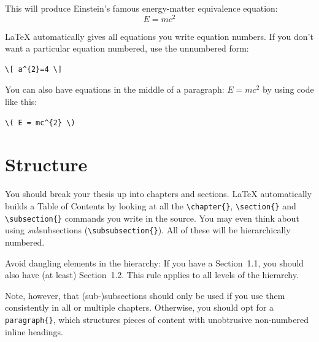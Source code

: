 This will produce Einstein's famous energy-matter equivalence equation:
\begin{equation}
E = mc^{2}
\label{eqn:Einstein}
\end{equation}

LaTeX automatically gives all equations you write equation numbers. If you don't want a particular equation numbered, use the unnumbered form:

\begin{lstlisting}[language={[LaTeX]TeX}]
\[ a^{2}=4 \]
\end{lstlisting}

You can also have equations in the middle of a paragraph: \( E = mc^{2} \) by using code like this: 

\begin{lstlisting}[language={[LaTeX]TeX}]
\( E = mc^{2} \)
\end{lstlisting}


\section{Structure}

You should break your thesis up into chapters and sections. LaTeX automatically builds a Table of Contents by looking at all the \verb|\chapter{}|, \verb|\section{}|  and \verb|\subsection{}| commands you write in the source. You may even think about using \emph{sub}subsections (\verb|\subsubsection{}|). All of these will be hierarchically numbered.

Avoid dangling elements in the hierarchy: If you have a Section~1.1, you should also have (at least) Section~1.2. This rule applies to all levels of the hierarchy.

Note, however, that (sub-)subsections should only be used if you use them consistently in all or multiple chapters. Otherwise, you should opt for a \verb|paragraph{}|, which structures pieces of content with unobtrusive non-numbered inline headings.

